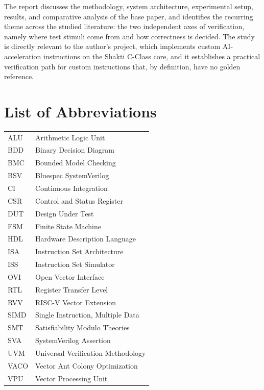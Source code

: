 \documentclass[12pt,a4paper]{report}
\begin{document}
The report discusses the methodology, system architecture, experimental setup, results,
and comparative analysis of the base paper, and identifies the recurring theme across the
studied literature: the two independent axes of verification, namely where test stimuli
come from and how correctness is decided. The study is directly relevant to the author's
project, which implements custom AI-acceleration instructions on the Shakti C-Class core,
and it establishes a practical verification path for custom instructions that, by
definition, have no golden reference.

\clearpage
{}
\chapter*{List of Abbreviations}
\begin{longtable}{ll}
ALU   & Arithmetic Logic Unit\\
BDD   & Binary Decision Diagram\\
BMC   & Bounded Model Checking\\
BSV   & Bluespec SystemVerilog\\
CI    & Continuous Integration\\
CSR   & Control and Status Register\\
DUT   & Design Under Test\\
FSM   & Finite State Machine\\
HDL   & Hardware Description Language\\
ISA   & Instruction Set Architecture\\
ISS   & Instruction Set Simulator\\
OVI   & Open Vector Interface\\
RTL   & Register Transfer Level\\
RVV   & RISC-V Vector Extension\\
SIMD  & Single Instruction, Multiple Data\\
SMT   & Satisfiability Modulo Theories\\
SVA   & SystemVerilog Assertion\\
UVM   & Universal Verification Methodology\\
VACO  & Vector Ant Colony Optimization\\
VPU   & Vector Processing Unit\\
\end{longtable}

\clearpage
{}
\listoffigures
\end{document}
